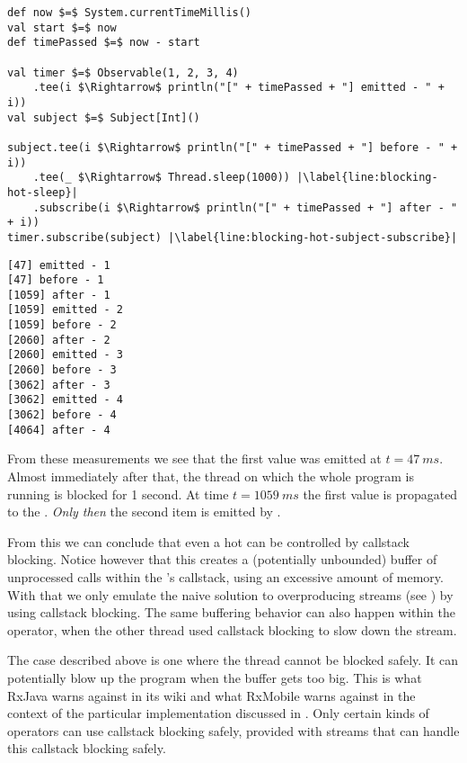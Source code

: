\begin{minipage}{\linewidth}
\begin{lstlisting}[style=ScalaStyle, caption={Applying callstack blocking on a hot \obs}, label={lst:blocking-hot-obs}]
def now $=$ System.currentTimeMillis()
val start $=$ now
def timePassed $=$ now - start

val timer $=$ Observable(1, 2, 3, 4)
    .tee(i $\Rightarrow$ println("[" + timePassed + "] emitted - " + i))
val subject $=$ Subject[Int]()

subject.tee(i $\Rightarrow$ println("[" + timePassed + "] before - " + i))
    .tee(_ $\Rightarrow$ Thread.sleep(1000)) |\label{line:blocking-hot-sleep}|
    .subscribe(i $\Rightarrow$ println("[" + timePassed + "] after - " + i))
timer.subscribe(subject) |\label{line:blocking-hot-subject-subscribe}|
\end{lstlisting}
\end{minipage}

\begin{minipage}{\linewidth}
\begin{lstlisting}[style=ScalaStyle, caption={Console output from \Cref{lst:blocking-hot-obs}}, label={lst:console-output-blocking-hot}]
[47] emitted - 1
[47] before - 1
[1059] after - 1
[1059] emitted - 2
[1059] before - 2
[2060] after - 2
[2060] emitted - 3
[2060] before - 3
[3062] after - 3
[3062] emitted - 4
[3062] before - 4
[4064] after - 4
\end{lstlisting}
\end{minipage}

From these measurements we see that the first value was emitted at $t=47\ ms$. Almost immediately after that, the thread on which the whole program is running is blocked for 1 second. At time $t=1059\ ms$ the first value is propagated to the . \emph{Only then} the second item is emitted by .

From this we can conclude that even a hot \obs can be controlled by callstack blocking. Notice however that this creates a (potentially unbounded) buffer of unprocessed  calls within the 's callstack, using an excessive amount of memory. With that we only emulate the naive solution to overproducing streams (see ) by using callstack blocking. The same buffering behavior can also happen within the  operator, when the other thread used callstack blocking to slow down the stream.

The case described above is one where the thread cannot be blocked safely. It can potentially blow up the program when the buffer gets too big. This is what RxJava warns against in its wiki \cite{RxJava-Wiki-Callstack-Blocking} and what RxMobile warns against in the context of the particular  implementation discussed in  \cite{RxMobile}. Only certain kinds of operators can use callstack blocking safely, provided with streams that can handle this callstack blocking safely.

